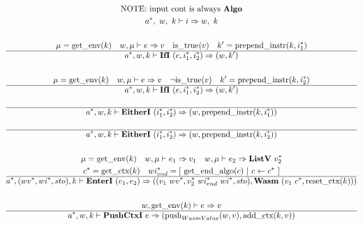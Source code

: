 
\begin{gather*}
  \text{NOTE: input cont is always \algo} \\
  \seq{a}, ~ w, ~ k \vdash i \Rightarrow w, ~ k \\
%
\newline \\
  \mu = \getenv(k) \quad w, \mu \vdash e \Rightarrow v \quad
  \istrue(v) \quad k' = \prependinstr(k, \seq{i_1}) \\
  \hline
  \seq{a}, w, k \vdash \ifi ~ (e, \seq{i_1}, \seq{i_2}) \Rightarrow (w, k') \\
%
\newline \\
  \mu = \getenv(k) \quad w, \mu \vdash e \Rightarrow v \quad
  \neg \istrue(v) \quad k' = \prependinstr(k, \seq{i_2}) \\
  \hline
  \seq{a}, w, k \vdash \ifi ~ (e, \seq{i_1}, \seq{i_2}) \Rightarrow (w, k') \\
%
\newline \\
  \hline
  \seq{a}, w, k \vdash \eitheri ~ (\seq{i_1}, \seq{i_2}) \Rightarrow (w, \prependinstr(k, \seq{i_1})) \\
%
\newline \\
  \hline
  \seq{a}, w, k \vdash \eitheri ~ (\seq{i_1}, \seq{i_2}) \Rightarrow (w, \prependinstr(k, \seq{i_2})) \\
%
\newline \\
  \mu = \getenv(k) \quad
  w, \mu \vdash e_1 \Rightarrow v_1 \quad
  w, \mu \vdash e_2 \Rightarrow \listv ~ \seq{v_2} \\
  \seq c = \getctx(k) \quad
  \seq{wi_{end}} = [ ~ \getendalgo(c) ~ | ~ c \leftarrow \seq c ~ ] \\
  \hline
  \seq{a}, (\seq{wv}, \seq{wi}, sto), k \vdash \enteri ~ (e_1, e_2)
  \Rightarrow
  ((v_1 ~ \seq{wv}, \seq{v_2} ~ \seq{wi_{end}}~ \seq{wi}, sto), \wasm ~ (v_1 ~ \seq c, \resetctx(k))) \\
%
\newline \\
  w, \getenv(k) \vdash e \Rightarrow v \\
  \hline
  \seq{a}, w, k \vdash \pushctxi ~ e
  \Rightarrow
  (\push_{WasmValue}(w, v), \addctx(k, v)) \\
%
\newline \\

\end{gather*}
